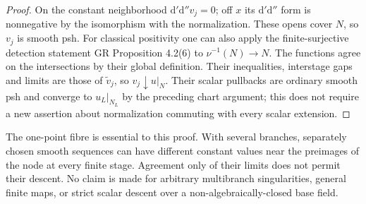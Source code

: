 \documentclass[11pt]{article}
\theoremstyle{remark}
\newcommand{\dd}{\mathrm d'\mathrm d''}
\begin{document}
\begin{proof}
On the constant neighborhood $\dd v_j=0$; off $x$ its $\dd$ form is
nonnegative by the isomorphism with the normalization. These opens cover
$N$, so $v_j$ is smooth psh. For classical positivity one can also apply
the finite-surjective detection statement GR Proposition 4.2(6) to
$\nu^{-1}(N)\to N$. The functions agree on the intersections by their
global definition. Their inequalities, interstage gaps and limits are
those of $\widetilde v_j$, so $v_j\downarrow u|_N$. Their scalar pullbacks
are ordinary smooth psh and converge to $u_L|_{N_L}$ by the preceding
chart argument; this does not require a new assertion about normalization
commuting with every scalar extension.
\end{proof}

The one-point fibre is essential to this proof. With several branches,
separately chosen smooth sequences can have different constant values
near the preimages of the node at every finite stage. Agreement only of
their limits does not permit their descent. No claim is made for arbitrary
multibranch singularities, general finite maps, or strict scalar descent
over a non-algebraically-closed base field.
\end{document}
